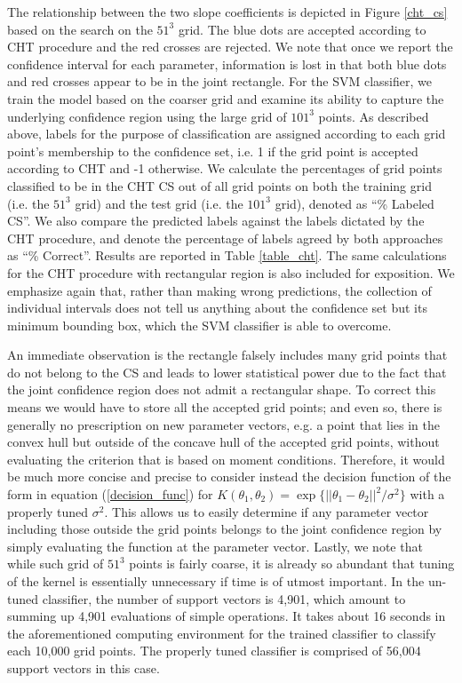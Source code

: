 \documentclass[12pt]{article}
\theoremstyle{definition}
\begin{document}
The relationship between the two slope coefficients is depicted in Figure \ref{cht_cs} based on the search on the $51^3$ grid. The blue dots are accepted according to CHT procedure and the red crosses are rejected. We note that once we report the confidence interval for each parameter, information is lost in that both blue dots and red crosses appear to be in the joint rectangle. For the SVM classifier, we train the model based on the coarser grid and examine its ability to capture the underlying confidence region using the large grid of $101^3$ points. As described above, labels for the purpose of classification are assigned according to each grid point's membership to the confidence set, i.e. 1 if the grid point is accepted according to CHT and -1 otherwise. We calculate the percentages of grid points classified to be in the CHT CS out of all grid points on both the training grid (i.e. the $51^3$ grid) and the test grid (i.e. the $101^3$ grid), denoted as ``\% Labeled CS''. We also compare the predicted labels against the labels dictated by the CHT procedure, and denote the percentage of labels agreed by both approaches as ``\% Correct''. Results are reported in Table \ref{table_cht}. The same calculations for the CHT procedure with rectangular region is also included for exposition. We emphasize again that, rather than making wrong predictions, the collection of individual intervals does not tell us anything about the confidence set but its minimum bounding box, which the SVM classifier is able to overcome. 

An immediate observation is the rectangle falsely includes many grid points that do not belong to the CS and leads to lower statistical power due to the fact that the joint confidence region does not admit a rectangular shape. To correct this means we would have to store all the accepted grid points; and even so, there is generally no prescription on new parameter vectors, e.g. a point that lies in the convex hull but outside of the concave hull of the accepted grid points, without evaluating the criterion that is based on moment conditions. Therefore, it would be much more concise and precise to consider instead the decision function of the form in equation (\ref{decision_func}) for $K(\theta_1,\theta_2)=\exp\{||\theta_1-\theta_2||^2/\sigma^2\}$ with a properly tuned $\sigma^2$. This allows us to easily determine if any parameter vector including those outside the grid points belongs to the joint confidence region by simply evaluating the function at the parameter vector. Lastly, we note that while such grid of $51^3$ points is fairly coarse, it is already so abundant that tuning of the kernel is essentially unnecessary if time is of utmost important. In the un-tuned classifier, the number of support vectors is 4,901, which amount to summing up 4,901 evaluations of simple operations. It takes about 16 seconds in the aforementioned computing environment for the trained classifier to classify each 10,000 grid points. The properly tuned classifier is comprised of 56,004 support vectors in this case. 
\end{document}
